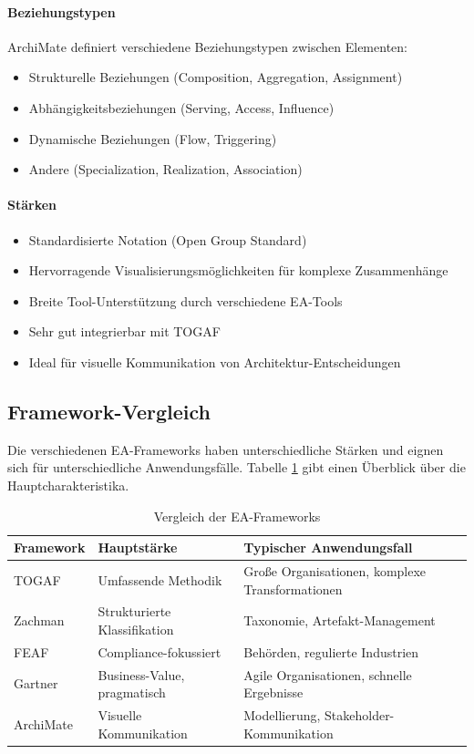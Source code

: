 \paragraph{Beziehungstypen}
ArchiMate definiert verschiedene Beziehungstypen zwischen Elementen:
\begin{itemize}
\item Strukturelle Beziehungen (Composition, Aggregation, Assignment)
\item Abhängigkeitsbeziehungen (Serving, Access, Influence)
\item Dynamische Beziehungen (Flow, Triggering)
\item Andere (Specialization, Realization, Association)
\end{itemize}

\paragraph{Stärken}
\begin{itemize}
\item Standardisierte Notation (Open Group Standard)
\item Hervorragende Visualisierungsmöglichkeiten für komplexe Zusammenhänge
\item Breite Tool-Unterstützung durch verschiedene EA-Tools
\item Sehr gut integrierbar mit TOGAF
\item Ideal für visuelle Kommunikation von Architektur-Entscheidungen
\end{itemize}

\subsection{Framework-Vergleich}
\label{subsec:framework-vergleich}

Die verschiedenen EA-Frameworks haben unterschiedliche Stärken und eignen sich für unterschiedliche Anwendungsfälle. Tabelle \ref{tab:framework-vergleich} gibt einen Überblick über die Hauptcharakteristika.

\begin{table}[h]
\centering
\caption{Vergleich der EA-Frameworks}
\label{tab:framework-vergleich}
\begin{tabular}{lll}
\toprule
\textbf{Framework} & \textbf{Hauptstärke} & \textbf{Typischer Anwendungsfall} \\
\midrule
TOGAF & Umfassende Methodik & Große Organisationen, komplexe Transformationen \\
Zachman & Strukturierte Klassifikation & Taxonomie, Artefakt-Management \\
FEAF & Compliance-fokussiert & Behörden, regulierte Industrien \\
Gartner & Business-Value, pragmatisch & Agile Organisationen, schnelle Ergebnisse \\
ArchiMate & Visuelle Kommunikation & Modellierung, Stakeholder-Kommunikation \\
\bottomrule
\end{tabular}
\end{table}


